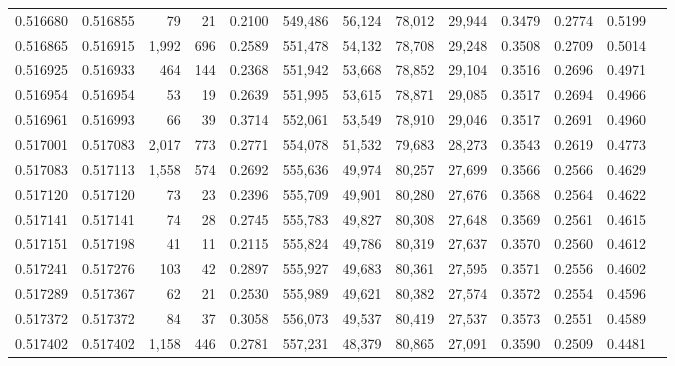 \begin{tabular}{rrrrrrrrrrrrr}
0.516680 & 0.516855 &    79 &    21 &                                     0.2100 & 549,486 &  56,124 &  78,012 &  29,944 & 0.3479 & 0.2774 & 0.5199 \\
0.516865 & 0.516915 & 1,992 &   696 &                                     0.2589 & 551,478 &  54,132 &  78,708 &  29,248 & 0.3508 & 0.2709 & 0.5014 \\
0.516925 & 0.516933 &   464 &   144 &                                     0.2368 & 551,942 &  53,668 &  78,852 &  29,104 & 0.3516 & 0.2696 & 0.4971 \\
0.516954 & 0.516954 &    53 &    19 &                                     0.2639 & 551,995 &  53,615 &  78,871 &  29,085 & 0.3517 & 0.2694 & 0.4966 \\
0.516961 & 0.516993 &    66 &    39 &                                     0.3714 & 552,061 &  53,549 &  78,910 &  29,046 & 0.3517 & 0.2691 & 0.4960 \\
0.517001 & 0.517083 & 2,017 &   773 &                                     0.2771 & 554,078 &  51,532 &  79,683 &  28,273 & 0.3543 & 0.2619 & 0.4773 \\
0.517083 & 0.517113 & 1,558 &   574 &                                     0.2692 & 555,636 &  49,974 &  80,257 &  27,699 & 0.3566 & 0.2566 & 0.4629 \\
0.517120 & 0.517120 &    73 &    23 &                                     0.2396 & 555,709 &  49,901 &  80,280 &  27,676 & 0.3568 & 0.2564 & 0.4622 \\
0.517141 & 0.517141 &    74 &    28 &                                     0.2745 & 555,783 &  49,827 &  80,308 &  27,648 & 0.3569 & 0.2561 & 0.4615 \\
0.517151 & 0.517198 &    41 &    11 &                                     0.2115 & 555,824 &  49,786 &  80,319 &  27,637 & 0.3570 & 0.2560 & 0.4612 \\
0.517241 & 0.517276 &   103 &    42 &                                     0.2897 & 555,927 &  49,683 &  80,361 &  27,595 & 0.3571 & 0.2556 & 0.4602 \\
0.517289 & 0.517367 &    62 &    21 &                                     0.2530 & 555,989 &  49,621 &  80,382 &  27,574 & 0.3572 & 0.2554 & 0.4596 \\
0.517372 & 0.517372 &    84 &    37 &                                     0.3058 & 556,073 &  49,537 &  80,419 &  27,537 & 0.3573 & 0.2551 & 0.4589 \\
0.517402 & 0.517402 & 1,158 &   446 &                                     0.2781 & 557,231 &  48,379 &  80,865 &  27,091 & 0.3590 & 0.2509 & 0.4481 \\

\end{tabular}
